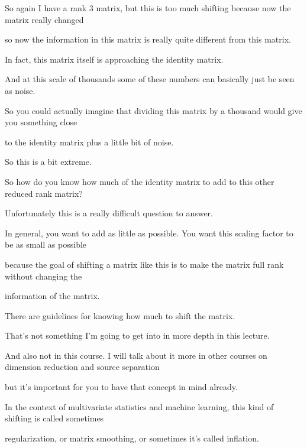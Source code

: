 \documentclass[fleqn,10pt]{olplainarticle}
\theoremstyle{definition}
\theoremstyle{remark}
\begin{document}
So again I have a rank 3 matrix, but this is too much shifting because now the matrix really changed

so now the information in this matrix is really quite different from this matrix.

In fact, this matrix itself is approaching the identity matrix.

And at this scale of thousands some of these numbers can basically just be seen as noise.

So you could actually imagine that dividing this matrix by a thousand would give you something close

to the identity matrix plus a little bit of noise.

So this is a bit extreme.

So how do you know how much of the identity matrix to add to this other reduced rank matrix?

Unfortunately this is a really difficult question to answer.

In general, you want to add as little as possible. You want this scaling factor to be as small as possible

because the goal of shifting a matrix like this is to make the matrix full rank without changing the

information of the matrix.

There are guidelines for knowing how much to shift the matrix.

That's not something I'm going to get into in more depth in this lecture.

And also not in this course. I will talk about it more in other courses on dimension reduction and source separation

but it's important for you to have that concept in mind already.

In the context of multivariate statistics and machine learning, this kind of shifting is called sometimes

regularization, or matrix smoothing, or sometimes it's called inflation.
\end{document}
